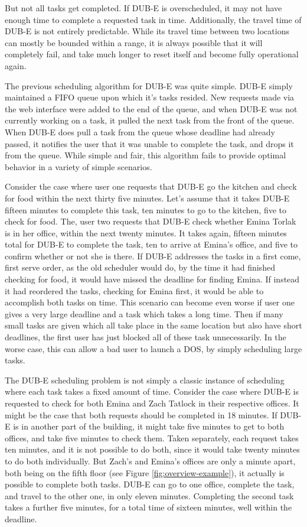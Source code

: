 \documentclass{article}
\begin{document}
But not all tasks get completed.
If DUB-E is overscheduled,
it may not have enough time to complete a requested task in time.
Additionally, the travel time of DUB-E
is not entirely predictable.
While its travel time between two locations
can mostly be bounded within a range,
it is always possible that it will completely fail,
and take much longer to reset itself
and become fully operational again.

The previous scheduling algorithm
for DUB-E was quite simple.
DUB-E simply maintained a FIFO queue
upon which it's tasks resided.
New requests made via the web interface
were added to the end of the queue,
and when DUB-E was not currently working on a task,
it pulled the next task from the front of the queue.
When DUB-E does pull a task from the queue
whose deadline had already passed,
it notifies the user that it was unable to complete the task,
and drops it from the queue.
While simple and fair,
this algorithm fails to provide
optimal behavior in a variety of simple scenarios.

Consider the case where user one
requests that DUB-E go the kitchen
and check for food
within the next thirty five minutes.
Let's assume that it takes DUB-E fifteen minutes
to complete this task,
ten minutes to go to the kitchen,
five to check for food.
The, user two requests that DUB-E
check whether Emina Torlak is in her office,
within the next twenty minutes.
It takes again, fifteen minutes total
for DUB-E to complete the task,
ten to arrive at Emina's office,
and five to confirm whether or not she is there.
If DUB-E addresses the tasks in a first come, first serve order,
as the old scheduler would do,
by the time it had finished checking for food,
it would have missed the deadline for finding Emina.
If instead it had reordered the tasks,
checking for Emina first,
it would be able to accomplish both tasks on time.
This scenario can become even worse if user one gives a
very large deadline and a task which takes a long time.
Then if many small tasks are given which all take place in
the same location but also have short deadlines, the first
user has just blocked all of these task unnecessarily.
In the worse case, this can allow a bad user to launch
a DOS, by simply scheduling large tasks.

The DUB-E scheduling problem is not simply
a classic instance of scheduling
where each task takes a fixed amount of time.
Consider the case where DUB-E
is requested to check for both Emina and Zach Tatlock
in their respective offices.
It might be the case that both requests
should be completed in 18 minutes.
If DUB-E is in another part of the building,
it might take five minutes to get to both offices,
and take five minutes to check them.
Taken separately, each request takes ten minutes,
and it is not possible to do both,
since it would take twenty minutes to do both individually.
But Zach's and Emina's offices are only a minute apart,
both being on the fifth floor (see Figure \ref{fig:overview-example}),
it actually is possible to complete both tasks.
DUB-E can go to one office, complete the task,
and travel to the other one,
in only eleven minutes.
Completing the second task takes a further five minutes,
for a total time of sixteen minutes,
well within the deadline.
\end{document}

